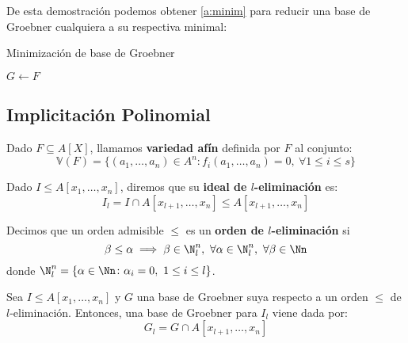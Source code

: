 De esta demostración podemos obtener \autoref{a:minim} para reducir una base de Groebner cualquiera a su respectiva minimal:
\begin{algorithm}[hbt!]
    \caption{Minimización de base de Groebner}\label{a:minim}

    $G\gets F$\;

\end{algorithm}


\subsection{Implicitación Polinomial}

\begin{definicion}Dado $F \subseteq A[X]$, llamamos \textbf{variedad afín} definida por $F$ al conjunto:
    \begin{equation*}
        \mathbb{V}(F) = \{(a_1,\dots, a_n)\in A^n : f_i(a_1,\dots, a_n)=0,\ \forall 1\le i \le s\}
    \end{equation*}
\end{definicion}

\begin{definicion}
    Dado $I\le A[x_1,\dots,x_n]$, diremos que su \textbf{ideal de $l$-eliminación} es:
    \begin{equation*}
        I_l = I \cap A[x_{l+1}, \dots, x_n] \le A[x_{l+1}, \dots, x_n]
    \end{equation*}
\end{definicion}

\begin{definicion}
    Decimos que un orden admisible $\le$ es un \textbf{orden de $l$-eliminación} si 
    $$\beta\le \alpha \implies \beta \in \N_l^n,\ \forall \alpha \in \N_l^n,\ \forall \beta \in \Nn$$
    donde $\N_l^n = \{\alpha\in \Nn \colon \alpha_i =0,\ 1\le i \le l\}$.
\end{definicion}

\begin{teorema}[Eliminación]
    Sea $I\le A[x_1,\dots,x_n]$ y $G$ una base de Groebner suya respecto a un orden $\le$ de $l$-eliminación. Entonces, una base de Groebner para $I_l$ viene dada por:
    \begin{equation*}
        G_l = G\cap A[x_{l+1},\dots, x_n]
    \end{equation*}
\end{teorema}

